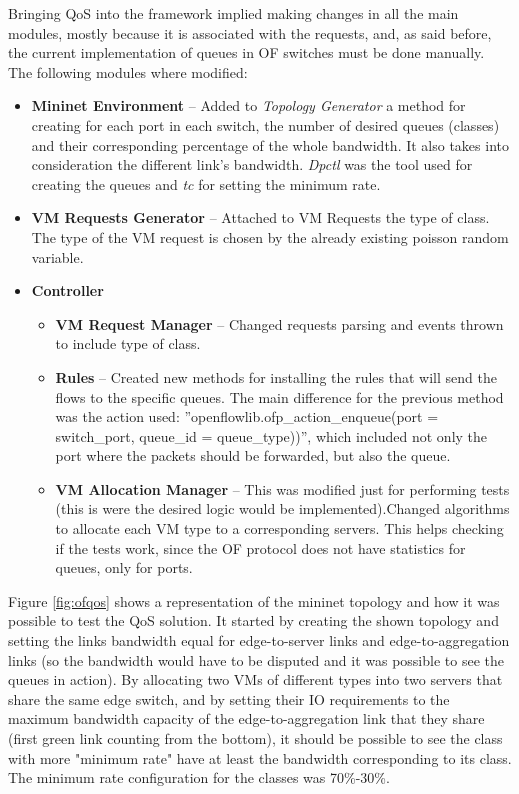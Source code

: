 \documentclass[12pt,english,oneside]{book}
\begin{document}
Bringing QoS into the framework implied making changes in all the main modules, mostly because it is associated with the requests, and, as said before, the current implementation of queues in OF switches must be done manually.
The following modules where modified:
\begin{itemize}
  \item \textbf{Mininet Environment} -- Added to \textit{Topology Generator} a method for creating for each port in each switch, the number of desired queues (classes) and their corresponding percentage of the whole bandwidth. It also takes into consideration the different link's bandwidth. \textit{Dpctl} was the tool used for creating the queues and \textit{tc} for setting the minimum rate.

  \item \textbf{VM Requests Generator} -- Attached to VM Requests the type of class. The type of the VM request is chosen by the already existing poisson random variable.

  \item \textbf{Controller}
  \begin{itemize}
    \item \textbf{VM Request Manager} -- Changed requests parsing and events thrown to include type of class.
    \item \textbf{Rules} -- Created new methods for installing the rules that will send the flows to the specific queues. The main difference for the previous method was the action used: ''openflowlib.ofp\_action\_enqueue(port = switch\_port, queue\_id = queue\_type))'', which included not only the port where the packets should be forwarded, but also the queue.

    \item \textbf{VM Allocation Manager} -- This was modified just for performing tests (this is were the desired logic would be implemented).Changed algorithms to allocate each VM type to a corresponding servers. This helps checking if the tests work, since the OF protocol does not have statistics for queues, only for ports.
  \end{itemize}
\end{itemize}

Figure \ref{fig:ofqos} shows a representation of the mininet topology and how it was possible to test the QoS solution.
It started by creating the shown topology and setting the links bandwidth equal for edge-to-server links and edge-to-aggregation links (so the bandwidth would have to be disputed and it was possible to see the queues in action).
By allocating two VMs of different types into two servers that share the same edge switch, and by setting their IO requirements to the maximum bandwidth capacity of the edge-to-aggregation link that they share (first green link counting from the bottom), it should be possible to see the class with more "minimum rate" have at least the bandwidth corresponding to its class.
The minimum rate configuration for the classes was 70\%-30\%.
\end{document}
